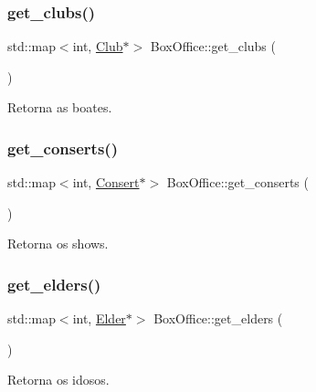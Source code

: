 \subsubsection{\texorpdfstring{get\+\_\+clubs()}{get\_clubs()}}
{\footnotesize\ttfamily std\+::map$<$int, \hyperlink{class_club}{Club}$\ast$$>$ Box\+Office\+::get\+\_\+clubs (\begin{DoxyParamCaption}{ }\end{DoxyParamCaption})\hspace{0.3cm}{\ttfamily [inline]}}



Retorna as boates. 

\mbox{\label{class_box_office_a07aef87f21cd6791c3ede1159eeee076}} 
\subsubsection{\texorpdfstring{get\+\_\+conserts()}{get\_conserts()}}
{\footnotesize\ttfamily std\+::map$<$int, \hyperlink{class_consert}{Consert}$\ast$$>$ Box\+Office\+::get\+\_\+conserts (\begin{DoxyParamCaption}{ }\end{DoxyParamCaption})\hspace{0.3cm}{\ttfamily [inline]}}



Retorna os shows. 

\mbox{\label{class_box_office_a4c22fa9fa95585ca73eaeeb708537333}} 
\subsubsection{\texorpdfstring{get\+\_\+elders()}{get\_elders()}}
{\footnotesize\ttfamily std\+::map$<$int, \hyperlink{class_elder}{Elder}$\ast$$>$ Box\+Office\+::get\+\_\+elders (\begin{DoxyParamCaption}{ }\end{DoxyParamCaption})\hspace{0.3cm}{\ttfamily [inline]}}



Retorna os idosos. 

